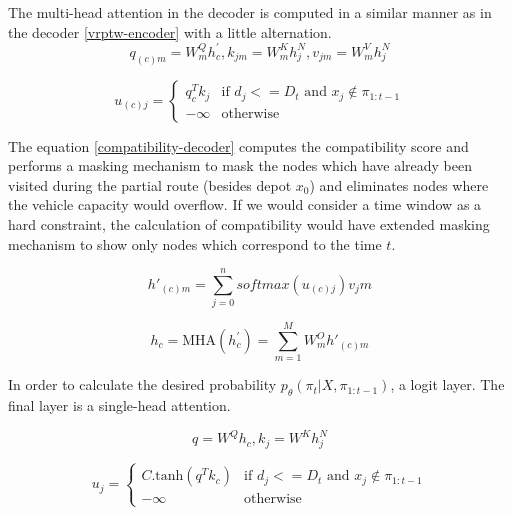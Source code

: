     The multi-head attention in the decoder is computed in a similar manner as in the decoder \ref{vrptw-encoder} with a little alternation.
    \begin{equation}
        q_{(c)m} = W_m^Q h_{c}^{'}, k_{jm} = W_m^K h_{j}^{N}, v_{jm} = W_m^V h_{j}^{N}
    \end{equation}
    
    \begin{equation}\label{compatibility-decoder}
        u_{(c)j} = \begin{cases} q_c^T k_j &\mbox{if }  d_j <= D_t \text{ and } x_j \notin \pi_{1:t-1} \\ -\infty &\mbox{otherwise} \end{cases}
    \end{equation}
    
    The equation \ref{compatibility-decoder} computes the compatibility score and performs a masking mechanism to mask the nodes which have already been visited during the partial route (besides depot $x_0$) and eliminates nodes where the vehicle capacity would overflow. If we would consider a time window as a hard constraint, the calculation of compatibility would have extended masking mechanism to show only nodes which correspond to the time $t$.
    
    \begin{equation}
        h'_{(c)m} = \sum_{j=0}^n softmax(u_{(c)j}) v_jm
    \end{equation}
        
    \begin{equation}
        h_{c} = \text{MHA}(h_{c}^{'}) = \sum_{m=1}^M W_{m}^O h'_{(c)m}
    \end{equation}
    
    In order to calculate the desired probability $p_{\theta}(\pi_t|X, \pi_{1:t-1})$, a logit layer. The final layer is a single-head attention.
    
    \begin{equation}
        q = W^Q h_c, k_j = W^K h_j^N
    \end{equation}
    
    \begin{equation}
        u_j = \begin{cases} C . \text{tanh}(q^T k_{c}) &\mbox{if }  d_j <= D_t \text{ and } x_j \notin \pi_{1:t-1} \\ -\infty &\mbox{otherwise} \end{cases}
    \end{equation}
    
